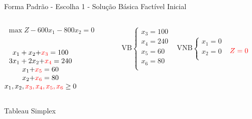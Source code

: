 \begin{frame}
	{
		\begin{block}{Forma Padrão - {\color{cyan}Escolha 1} - Solução Básica Factível Inicial}
			\begin{columns}
				\begin{column}{0.35\textwidth}
					$
						\begin{matrix}
							\max Z - 600x_1 - 800x_2 = 0 \\
						\end{matrix}
					$ \\
					 \\
					$
						\begin{matrix}
							x_1+x_2  {+\color{red}x_3} = 100 \\
							3x_1+2x_2 {+ \color{red}x_4} = 240 \\
							x_1  {+ \color{red}x_5} = 60 \\
							x_2 {+ \color{red}x_6} = 80 \\
							x_1,x_2, {\color{red} x_3, x_4, x_5, x_6} \ge 0 \\
						\end{matrix}
					$
				\end{column}
				\vline
				\hspace{0.1cm}
				\begin{column}{0.45\textwidth}
					$
						\begin{matrix}
							\text{VB} \left\{  \begin{matrix}
														 x_3 = 100 \\
														 x_4 = 240 \\
														 x_5 = 60 \\
														 x_6 = 80 \\
								   \end{matrix} 
						   \right.
							&
							\text{VNB} \left\{  \begin{matrix}
														 x_1 = 0 \\
														 x_2 = 0 \\
								   \end{matrix} 
						   \right. 
							\\
							 & \\
						\end{matrix}
					$
					$ {\color{red}Z = 0} $
				\end{column}
			\end{columns}
		\end{block}
	}
	{
 		\begin{block}{Tableau Simplex}

\end{block}}
\end{frame}
